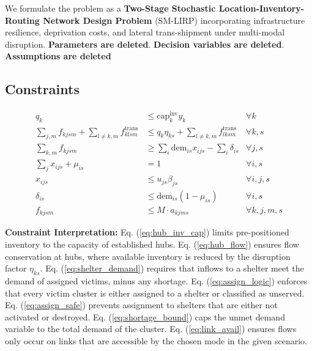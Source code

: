 {We formulate the problem as a \textbf{Two-Stage Stochastic Location-Inventory-Routing Network Design Problem} (SM-LIRP) incorporating infrastructure resilience, deprivation costs, and lateral trans-shipment under multi-modal disruption. \textbf{Parameters are deleted}. \textbf{Decision variables are deleted}. \textbf{Assumptions are deleted}

\subsection*{Constraints}

\begin{align}
    q_k & \le \text{cap}_k^{\text{inv}} y_k & \forall k \label{eq:hub_inv_cap} \\
    \sum_{j,m} f_{kjsm} + \sum_{l \neq k, m} f_{klsm}^{\text{trans}} & \le q_k \eta_{ks} + \sum_{l \neq k, m} f_{lksm}^{\text{trans}} & \forall k, s \label{eq:hub_flow} \\
    \sum_{k,m} f_{kjsm} & \ge \sum_{i} \text{dem}_{is} x_{ijs} - \sum_{i} \delta_{is} & \forall j, s \label{eq:shelter_demand} \\
    \sum_{j} x_{ijs} + \mu_{is} & = 1 & \forall i, s \label{eq:assign_logic} \\
    x_{ijs} & \le u_{js} \beta_{js} & \forall i, j, s \label{eq:assign_safe} \\
    \delta_{is} & \le \text{dem}_{is} (1-\mu_{is}) & \forall i, s \label{eq:shortage_bound} \\
    f_{kjsm} & \le M \cdot a_{kjms} & \forall k, j, m, s \label{eq:link_avail}
\end{align}

\noindent \textbf{Constraint Interpretation:}
Eq. (\ref{eq:hub_inv_cap}) limits pre-positioned inventory to the capacity of established hubs.
Eq. (\ref{eq:hub_flow}) ensures flow conservation at hubs, where available inventory is reduced by the disruption factor $\eta_{ks}$.
Eq. (\ref{eq:shelter_demand}) requires that inflows to a shelter meet the demand of assigned victims, minus any shortage.
Eq. (\ref{eq:assign_logic}) enforces that every victim cluster is either assigned to a shelter or classified as unserved.
Eq. (\ref{eq:assign_safe}) prevents assignment to shelters that are either not activated or destroyed.
Eq. (\ref{eq:shortage_bound}) caps the unmet demand variable to the total demand of the cluster.
Eq. (\ref{eq:link_avail}) ensures flows only occur on links that are accessible by the chosen mode in the given scenario.

}

